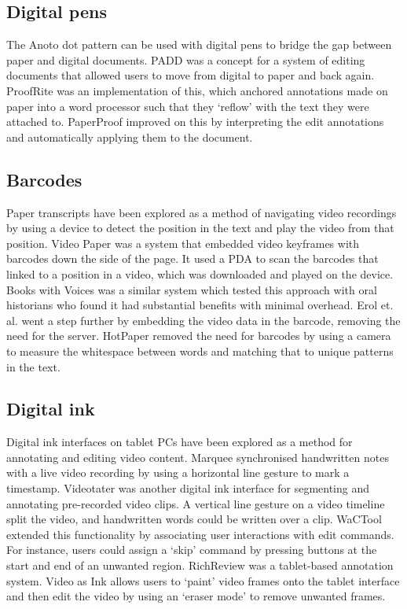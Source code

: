 \subsection{Digital pens}
The Anoto dot pattern can be used with digital pens to bridge the gap between paper and digital documents. PADD
\citep{Guimbretiere2003} was a concept for a system of editing documents that allowed users to move from digital to
paper and back again. ProofRite \citep{Conroy2004} was an implementation of this, which anchored annotations made on
paper into a word processor such that they `reflow' with the text they were attached to.  PaperProof \citep{Weibel2008}
improved on this by interpreting the edit annotations and automatically applying them to the document.

\subsection{Barcodes}
Paper transcripts have been explored as a method of navigating video recordings by using a device to detect the
position in the text and play the video from that position. Video Paper \citep{Hull2003} was a system that embedded
video keyframes with barcodes down the side of the page. It used a PDA to scan the barcodes that linked to a position
in a video, which was downloaded and played on the device. Books with Voices \citep{Klemmer2003} was a similar system
which tested this approach with oral historians who found it had substantial benefits with minimal overhead. Erol et.
al. \citep{Erol2007} went a step further by embedding the video data in the barcode, removing the need for the server.
HotPaper \citep{Erol2008} removed the need for barcodes by using a camera to measure the whitespace between words and
matching that to unique patterns in the text.

\subsection{Digital ink}
Digital ink interfaces on tablet PCs have been explored as a method for annotating and editing video content.  Marquee
\citep{Weher1994} synchronised handwritten notes with a live video recording by using a horizontal line gesture to mark
a timestamp.  Videotater \citep{Diakopoulos2006} was another digital ink interface for segmenting and annotating
pre-recorded video clips. A vertical line gesture on a video timeline split the video, and handwritten words could be
written over a clip. WaCTool \citep{Cattelan2008} extended this functionality by associating user interactions with
edit commands. For instance, users could assign a `skip' command by pressing buttons at the start and end of an
unwanted region.
RichReview \citep{Yoon2014} was a tablet-based annotation system.
Video as Ink \citep{Cabral2016} allows users to `paint' video frames onto the tablet interface and
then edit the video by using an `eraser mode' to remove unwanted frames.

